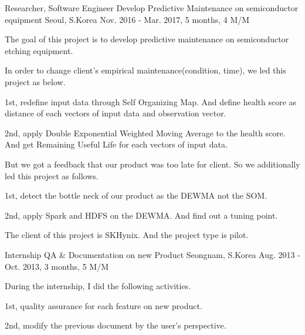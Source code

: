 \begin{cventries}
  \cventry
    {Researcher, Software Engineer} %
    {Develop Predictive Maintenance on semiconductor equipment} %
    {Seoul, S.Korea} %
    {Nov. 2016 - Mar. 2017, 5 months, 4 M/M} %
    {
      \begin{cvitems} %
        \item {The goal of this project is to develop predictive maintenance on semiconductor etching equipment.}
        \item {In order to change client's empirical maintenance(condition, time), we led this project as below.}
        \item {1st, redefine input data through Self Organizing Map. And define health score as distance of each vectors of input data and observation vector.}
        \item {2nd, apply Double Exponential Weighted Moving Average to the health score. And get Remaining Useful Life for each vectors of input data.}
        \item {But we got a feedback that our product was too late for client. So we additionally led this project as follows.}
        \item {1st, detect the bottle neck of our product as the DEWMA not the SOM.}
        \item {2nd, apply Spark and HDFS on the DEWMA. And find out a tuning point.}
        \item {The client of this project is SKHynix. And the project type is pilot.}
      \end{cvitems}
    }

  \cventry
    {Internship} %
    {QA \& Documentation on new Product} %
    {Seongnam, S.Korea} %
    {Aug. 2013 - Oct. 2013, 3 months, 5 M/M} %
    {
      \begin{cvitems} %
        \item {During the internship, I did the following activities.}
        \item {1st, quality assurance for each feature on new product.}
        \item {2nd, modify the previous document by the user's perspective.}
      \end{cvitems}
    }

\end{cventries}
